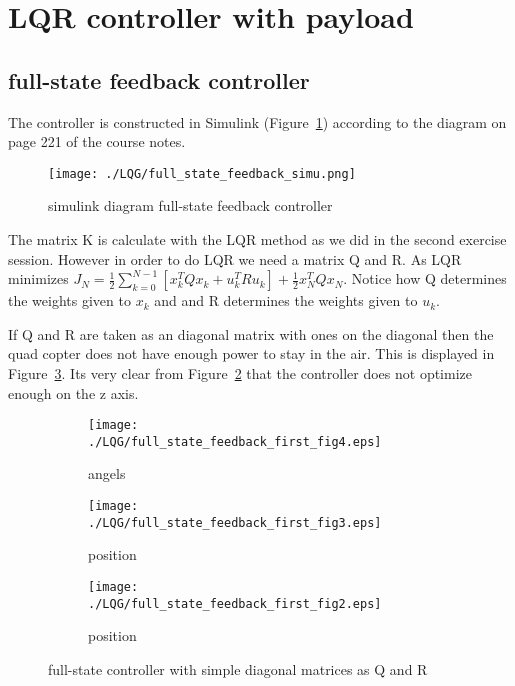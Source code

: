 \section{LQR controller with payload}
\subsection{full-state feedback controller}

The controller is constructed in Simulink (Figure~\ref{fig:simulink diagram full-state feedback controller}) according to the diagram on page 221 of the course notes. 

\begin{figure}[H]
	\centering
	\texttt{[image: ./LQG/full\_state\_feedback\_simu.png]}
	\caption{simulink diagram full-state feedback controller}
	\label{fig:simulink diagram full-state feedback controller}
\end{figure}

The matrix K is calculate with the LQR method as we did in the second exercise session. However in order to do LQR we need a matrix Q and R. As LQR minimizes $J_N = \frac{1}{2} \sum_{k=0}^{N-1}[x_k^TQx_k + u^T_kRu_k] + \frac{1}{2}x_N^TQx_N$. Notice how Q determines the weights given to $x_k$ and and R determines the weights given to $u_k$. 

If Q and R are taken as an diagonal matrix with ones on the diagonal then the quad copter does not have enough power to stay in the air. This is displayed in Figure~\ref{fig:full-state controller with simple diagonal matrices as Q and R}. Its very clear from Figure~\ref{fig:full-state controller with simple diagonal matrices as Q and R demo bad z position} that the controller does not optimize enough on the z axis.

\begin{figure}[H]
	\centering
	\begin{subfigure}[b]{0.3\textwidth}
		\texttt{[image: ./LQG/full\_state\_feedback\_first\_fig4.eps]}
		\caption{angels}
	\end{subfigure}
	\begin{subfigure}[b]{0.3\textwidth}
		\texttt{[image: ./LQG/full\_state\_feedback\_first\_fig3.eps]}
		\caption{position}
		\label{fig:full-state controller with simple diagonal matrices as Q and R demo bad z position}
	\end{subfigure}
	\begin{subfigure}[b]{0.3\textwidth}
		\texttt{[image: ./LQG/full\_state\_feedback\_first\_fig2.eps]}
		\caption{position}
	\end{subfigure}
	\caption{full-state controller with simple diagonal matrices as Q and R}\label{fig:full-state controller with simple diagonal matrices as Q and R}
\end{figure}

